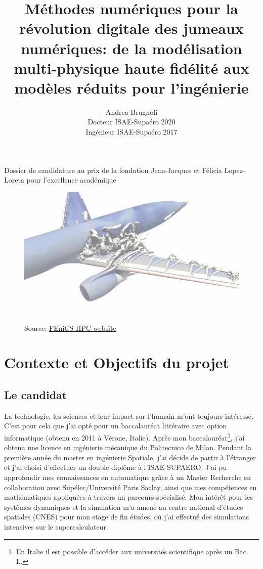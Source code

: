 \documentclass[french]{article}
\author{Andrea Brugnoli \\ 
\hspace{2.8pt} Docteur ISAE-Supaéro 2020\\
Ingénieur ISAE-Supaéro 2017}
\title{Méthodes numériques pour la révolution digitale des jumeaux numériques: de la modélisation multi-physique haute fidélité aux modèles réduits pour l'ingénierie}
\date{}
\begin{document}
\maketitle

\large{Dossier de candidature au prix de la fondation Jean-Jacques et Félicia
	Lopez-Loreta pour l’excellence académique}


\begin{figure}[h]
	\centering
	\includegraphics[width=.95\textwidth]{3Dplane.jpg}
	\captionsetup{labelformat=empty}
	\caption{Source: \href{http://www.fenics-hpc.org/}{FEniCS-HPC website}}
\end{figure}





\thispagestyle{empty}

\newpage

\section{Contexte et Objectifs du projet}

\subsection{Le candidat}


La technologie,  les sciences et leur impact sur l'humain m'ont toujours intéressé. C'est pour cela que j'ai opté pour un baccalauréat littéraire avec option informatique (obtenu en 2011 \`a Vérone, Italie). Après mon baccalauréat\footnote{En Italie il est possible d'accéder aux universités scientifique après un Bac. L.}, j'ai obtenu une licence en ingénierie mécanique du Politecnico de Milan. Pendant la première année du master en ingénierie Spatiale, j'ai décide de partir \`a l'étranger et j'ai choisi d'effectuer un double diplôme \`a l'ISAE-SUPAERO. J'ai pu approfondir mes connaissances en automatique grâce \`a un Master Recherche en collaboration avec Supélec/Université Paris Saclay, ainsi que mes compétences en mathématiques appliquées \`a travers un parcours spécialisé. Mon intérêt pour les systèmes dynamiques et la simulation m'a amené au centre national d'études spatiales (CNES) pour mon stage de fin études, o\`u j'ai effectué des simulations intensives sur le supercalculateur. \\
\end{document}
